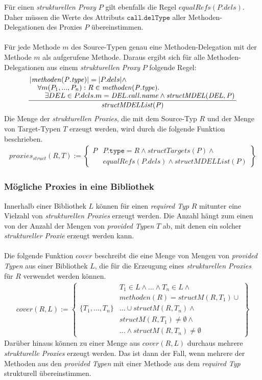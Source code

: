 \documentclass[a4paper,12pt]{article}
\begin{document}
Für einen \emph{strukturellen Proxy} $P$ gilt ebenfalls die Regel $\mathit{equalRefs(P.dels)}$. Daher müssen die Werte des Attributs $\texttt{call.delType}$ aller Methoden-Delegationen des Proxies $P$ übereinstimmen.\\\\
Für jede Methode $m$ des Source-Typen genau eine Methoden-Delegation mit der Methode $m$ als aufgerufene Methode. Daraus ergibt sich für alle Methoden-Delegationen aus einem \emph{strukturellen Proxy} $P$ folgende Regel:
\begin{gather*}
\frac{\splitfrac{|\mathit{methoden(P.type)}| = |P.dels| \wedge}{ \splitfrac{\forall m(P_1,...,P_n):R \in \mathit{methoden(P.type)}.}{\exists DEL \in P.dels.m = \mathit{DEL.call.name} \wedge \mathit{structMDEL(DEL,P)}
 }}
}
{\mathit{structMDELList(P)}}
\end{gather*}
Die Menge der \emph{strukturellen Proxies}, die mit dem Source-Typ $R$ und der Menge von Target-Typen $T$ erzeugt werden, wird durch die folgende Funktion beschrieben.
\begin{gather*}
\mathit{proxies_{struct}(R,T)} := 
\left\{\begin{array}{l|l}
	P	& P\texttt{.type} = R \wedge  \mathit{structTargets(P)} \wedge \mathit{ }\\
		& \mathit{equalRefs(P.dels)} \wedge \mathit{structMDELList(P)} 
		 \end{array}
\right\}
\end{gather*}

\subsubsection{Mögliche Proxies in eine Bibliothek}
Innerhalb einer Bibliothek $L$ können für einen \emph{required Typ} $R$ mitunter eine Vielzahl von \emph{strukturellen Proxies} erzeugt werden. Die Anzahl hängt zum einen von der Anzahl der Mengen von \emph{provided Typen} $T$ ab, mit denen ein solcher \emph{struktureller Proxie} erzeugt werden kann.\\\\
Die folgende Funktion $\mathit{cover}$ beschreibt die eine Menge von Mengen von \emph{provided Typen} aus einer Bibliothek $L$, die für die Erzeugung eines \emph{strukturellen Proxies} für $R$ verwendet werden können.
\begin{gather*}
cover(R,L) := 
\left\{\begin{array}{l|l}
					& T_1 \in L \wedge \text{...} \wedge T_n \in L \wedge \\
					& methoden(R) = structM(R,T_1) \cup \\
	\{T_1,...,T_n\}	& \texttt{...} \cup structM(R, T_n) \wedge \\
					& \mathit{structM(R,T_1)} \neq \emptyset \wedge \\
					& \texttt{...}\wedge \mathit{structM(R,T_n)} \neq \emptyset 
\end{array}\right\}
\end{gather*}
Darüber hinaus können zu einer Menge aus $\mathit{cover(R,L)}$ durchaus mehrere \emph{strukturelle Proxies} erzeugt werden. Das ist dann der Fall, wenn mehrere der Methoden aus den \emph{provided Typen} mit einer Methode aus dem \emph{required Typ} strukturell übereinstimmen. 
\end{document}
